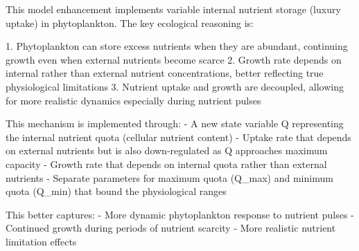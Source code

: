 This model enhancement implements variable internal nutrient storage (luxury uptake) in phytoplankton. The key ecological reasoning is:

1. Phytoplankton can store excess nutrients when they are abundant, continuing growth even when external nutrients become scarce
2. Growth rate depends on internal rather than external nutrient concentrations, better reflecting true physiological limitations
3. Nutrient uptake and growth are decoupled, allowing for more realistic dynamics especially during nutrient pulses

This mechanism is implemented through:
- A new state variable Q representing the internal nutrient quota (cellular nutrient content)
- Uptake rate that depends on external nutrients but is also down-regulated as Q approaches maximum capacity
- Growth rate that depends on internal quota rather than external nutrients
- Separate parameters for maximum quota (Q_max) and minimum quota (Q_min) that bound the physiological ranges

This better captures:
- More dynamic phytoplankton response to nutrient pulses
- Continued growth during periods of nutrient scarcity
- More realistic nutrient limitation effects
